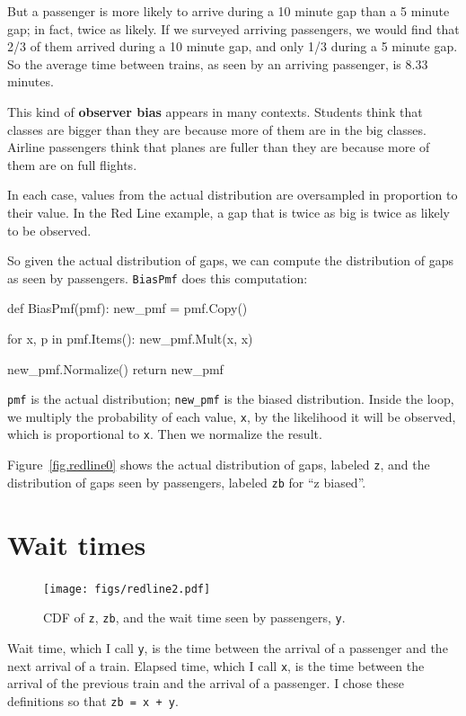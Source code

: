 \documentclass[12pt]{book}
\theoremstyle{exercise}
\newcommand{\py}[1]{{\tt #1}}%
\begin{document}
But a passenger is more likely to arrive during a 10 minute gap
than a 5 minute gap; in fact, twice as likely.  If we surveyed
arriving passengers, we would find that 2/3 of them arrived during
a 10 minute gap, and only 1/3 during a 5 minute gap.  So the
average time between trains, as seen by an arriving passenger,
is 8.33 minutes.

This kind of {\bf observer bias} appears in many contexts.  Students
think that classes are bigger than they are because more of them are
in the big classes.  Airline passengers think that planes are fuller
than they are because more of them are on full flights.

In each case, values from the actual distribution are
oversampled in proportion to their value.  In the Red Line example,
a gap that is twice as big is twice as likely to be observed.

So given the actual distribution of gaps, we can compute the
distribution of gaps as seen by passengers.  \py{BiasPmf}
does this computation:

\begin{code}
def BiasPmf(pmf):
    new_pmf = pmf.Copy()

    for x, p in pmf.Items():
        new_pmf.Mult(x, x)

    new_pmf.Normalize()
    return new_pmf
\end{code}

\py{pmf} is the actual distribution; \verb"new_pmf" is the
biased distribution.  Inside the loop, we multiply the
probability of each value, \py{x}, by the likelihood it will
be observed, which is proportional to \py{x}.  Then we
normalize the result.

Figure~\ref{fig.redline0} shows the actual distribution of gaps,
labeled \py{z}, and the distribution of gaps seen by passengers,
labeled \py{zb} for ``z biased''.


\section{Wait times}

\begin{figure}
\centerline{\texttt{[image: figs/redline2.pdf]}}
\caption{CDF of \py{z}, \py{zb}, and the wait time seen
by passengers, \py{y}. }
\label{fig.redline2}
\end{figure}

Wait time, which I call \py{y}, is the time between the arrival
of a passenger and the next arrival of a train.  Elapsed time, which I
call \py{x}, is the time between the arrival of the previous
train and the arrival of a passenger.  I chose these definitions
so that \py{zb = x + y}.
\end{document}
